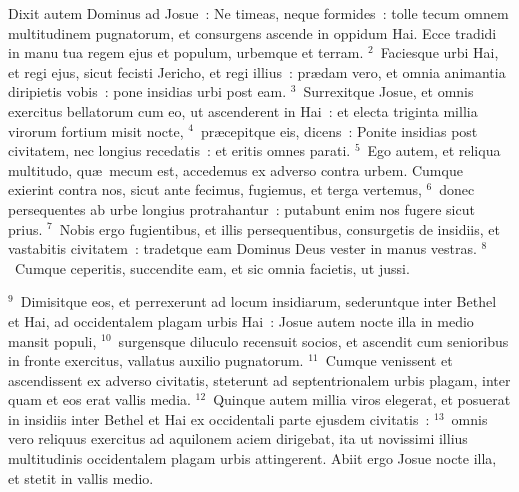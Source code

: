 \lettrine[lines=3,image=true,loversize=0.05,lraise=-0.03]{D}{}ixit autem Dominus ad Josue~: Ne timeas, neque formides~: tolle tecum omnem multitudinem pugnatorum, et consurgens ascende in oppidum Hai. Ecce tradidi in manu tua regem ejus et populum, urbemque et terram.
${}^{2}$~Faciesque urbi Hai, et regi ejus, sicut fecisti Jericho, et regi illius~: pr\ae dam vero, et omnia animantia diripietis vobis~: pone insidias urbi post eam.
${}^{3}$~Surrexitque Josue, et omnis exercitus bellatorum cum eo, ut ascenderent in Hai~: et electa triginta millia virorum fortium misit nocte,
${}^{4}$~pr\ae cepitque eis, dicens~: Ponite insidias post civitatem, nec longius recedatis~: et eritis omnes parati.
${}^{5}$~Ego autem, et reliqua multitudo, qu\ae\ mecum est, accedemus ex adverso contra urbem. Cumque exierint contra nos, sicut ante fecimus, fugiemus, et terga vertemus,
${}^{6}$~donec persequentes ab urbe longius protrahantur~: putabunt enim nos fugere sicut prius.
${}^{7}$~Nobis ergo fugientibus, et illis persequentibus, consurgetis de insidiis, et vastabitis civitatem~: tradetque eam Dominus Deus vester in manus vestras.
${}^{8}$~Cumque ceperitis, succendite eam, et sic omnia facietis, ut jussi.


${}^{9}$~Dimisitque eos, et perrexerunt ad locum insidiarum, sederuntque inter Bethel et Hai, ad occidentalem plagam urbis Hai~: Josue autem nocte illa in medio mansit populi,
${}^{10}$~surgensque diluculo recensuit socios, et ascendit cum senioribus in fronte exercitus, vallatus auxilio pugnatorum.
${}^{11}$~Cumque venissent et ascendissent ex adverso civitatis, steterunt ad septentrionalem urbis plagam, inter quam et eos erat vallis media.
${}^{12}$~Quinque autem millia viros elegerat, et posuerat in insidiis inter Bethel et Hai ex occidentali parte ejusdem civitatis~:
${}^{13}$~omnis vero reliquus exercitus ad aquilonem aciem dirigebat, ita ut novissimi illius multitudinis occidentalem plagam urbis attingerent. Abiit ergo Josue nocte illa, et stetit in vallis medio.


